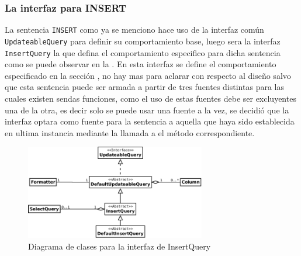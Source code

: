 \subsubsection{La interfaz para INSERT}
La sentencia \verb=INSERT= como ya se menciono hace uso de la interfaz común \verb=UpdateableQuery= para definir su comportamiento base, luego sera la interfaz \verb=InsertQuery= la que defina el comportamiento especifico para dicha sentencia como se puede observar en la . En esta interfaz se define el comportamiento especificado en la sección \pageref{especificacion:dialectos:insert}, no hay mas para aclarar con respecto al diseño salvo que esta sentencia puede ser armada a partir de tres fuentes distintas para las cuales existen sendas funciones, como el uso de estas fuentes debe ser excluyentes una de la otra, es decir solo se puede usar una fuente a la vez, se decidió que la interfaz optara como fuente para la sentencia a aquella que haya sido establecida en ultima instancia mediante la llamada a el método correspondiente.
%
\begin{figure}
  \centering
    \includegraphics[width=0.7\textwidth]{figuras/jdbgm-dc-insert.png}
  \caption{Diagrama de clases para la interfaz de InsertQuery}
  \label{fig:dc-insertquery}
\end{figure}
%
